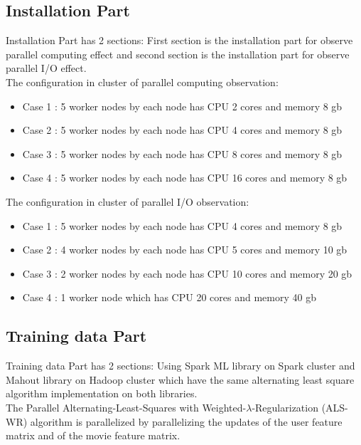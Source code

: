 \documentclass[conference]{IEEEtran}
\begin{document}
\subsection{Installation Part}
Installation Part has 2 sections: First section is the installation part for observe parallel computing effect and second section is the installation part for observe parallel I/O effect. \\
\indent The configuration in cluster of parallel computing observation:
\begin{itemize}
\item Case 1 : 5 worker nodes by each node has CPU 2 cores and memory 8 gb
\item Case 2 : 5 worker nodes by each node has CPU 4 cores and memory 8 gb
\item Case 3 : 5 worker nodes by each node has CPU 8 cores and memory 8 gb
\item Case 4 : 5 worker nodes by each node has CPU 16 cores and memory 8 gb
\end{itemize}
\indent The configuration in cluster of parallel I/O observation:
\begin{itemize}
\item Case 1 : 5 worker nodes by each node has CPU 4 cores and memory 8 gb
\item Case 2 : 4 worker nodes by each node has CPU 5 cores and memory 10 gb
\item Case 3 : 2 worker nodes by each node has CPU 10 cores and memory 20 gb
\item Case 4 : 1 worker node which has CPU 20 cores and memory 40 gb
\end{itemize}

\subsection{Training data Part}
Training data Part has 2 sections: Using Spark ML library on Spark cluster and Mahout library on Hadoop cluster which have the same alternating least square algorithm implementation on both libraries. \\
\indent The Parallel Alternating-Least-Squares with Weighted-\begin{math}\lambda\end{math}-Regularization (ALS-WR) algorithm  is parallelized by parallelizing the updates of the user feature matrix and of the movie feature matrix.
\end{document}
